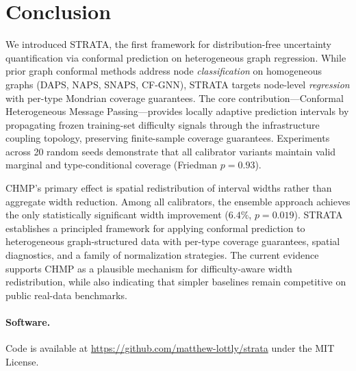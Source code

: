 \documentclass[twoside,11pt]{article}
\begin{document}
\section{Conclusion}
\label{sec:conclusion}

We introduced STRATA, the first framework for distribution-free uncertainty
quantification via conformal prediction on heterogeneous graph regression.
While prior graph conformal methods address node \emph{classification} on
homogeneous graphs (DAPS, NAPS, SNAPS, CF-GNN), STRATA targets node-level
\emph{regression} with per-type Mondrian coverage guarantees. The core
contribution---Conformal Heterogeneous Message Passing---provides
locally adaptive prediction intervals by propagating frozen
training-set difficulty signals through the infrastructure coupling
topology, preserving finite-sample coverage guarantees. Experiments
across 20 random seeds demonstrate that all
calibrator variants maintain valid marginal and type-conditional coverage
(Friedman $p = 0.93$).

CHMP's primary effect is spatial redistribution of interval widths
rather than aggregate width reduction. Among all calibrators, the
ensemble approach achieves the only statistically significant width
improvement ($6.4\%$, $p = 0.019$). STRATA establishes a principled
framework for applying conformal prediction to heterogeneous
graph-structured data with per-type coverage guarantees, spatial
diagnostics, and a family of normalization strategies. The current
evidence supports CHMP as a plausible mechanism for difficulty-aware
width redistribution, while also indicating that simpler baselines
remain competitive on public real-data benchmarks.


\paragraph{Software.} Code is available at
\url{https://github.com/matthew-lottly/strata}
under the MIT License.

\end{document}
